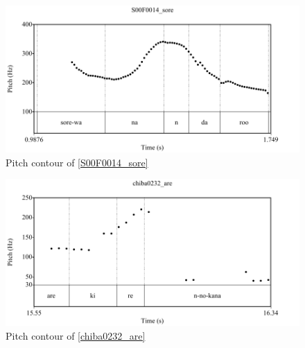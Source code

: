 

\begin{figure}
	\begin{center}
	\includegraphics[width=.95\textwidth]{sounds/S00F0014_sore.pdf}
	\caption{Pitch contour of \ref{S00F0014_sore}}
	\label{S00F0014_soreF}
	\end{center}
\end{figure}
\begin{figure}
	\begin{center}
	\includegraphics[width=.95\textwidth]{sounds/chiba0232_are.pdf}
	\caption{Pitch contour of \ref{chiba0232_are}}
	\label{chiba0232_areF}
	\end{center}
\end{figure}
